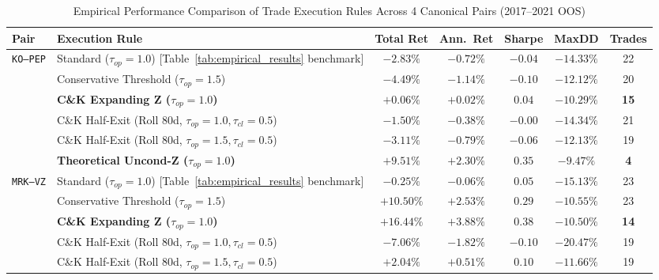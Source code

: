 \documentclass[11pt, a4paper]{article}
\begin{document}
\begin{table}[h!]
\centering
\footnotesize
\setlength{\tabcolsep}{2.5pt}
\caption{Empirical Performance Comparison of Trade Execution Rules Across 4 Canonical Pairs (2017--2021 OOS)}
\label{tab:trade_rules_comparison}
\begin{tabular}{lp{6.4cm}ccccc}
\toprule
\textbf{Pair} & \textbf{Execution Rule} & \textbf{Total Ret} & \textbf{Ann.\ Ret} & \textbf{Sharpe} & \textbf{MaxDD} & \textbf{Trades} \\
\midrule
\texttt{KO--PEP} & Standard ($\tau_{op}=1.0$) [Table~\ref{tab:empirical_results} benchmark] & $-2.83\%$ & $-0.72\%$ & $-0.04$ & $-14.33\%$ & 22 \\
                 & Conservative Threshold ($\tau_{op}=1.5$)                    & $-4.49\%$ & $-1.14\%$ & $-0.10$ & $-12.12\%$ & 20 \\
                 & \textbf{C\&K Expanding Z ($\tau_{op}=1.0$)}                 & $\mathbf{+0.06\%}$ & $\mathbf{+0.02\%}$ & $\mathbf{0.04}$ & $\mathbf{-10.29\%}$ & \textbf{15} \\
                 & C\&K Half-Exit (Roll 80d, $\tau_{op}=1.0, \tau_{cl}=0.5$)   & $-1.50\%$ & $-0.38\%$ & $-0.00$ & $-14.34\%$ & 21 \\
                 & C\&K Half-Exit (Roll 80d, $\tau_{op}=1.5, \tau_{cl}=0.5$)   & $-3.11\%$ & $-0.79\%$ & $-0.06$ & $-12.13\%$ & 19 \\
                 & \textbf{Theoretical Uncond-Z ($\tau_{op}=1.0$)}            & $\mathbf{+9.51\%}$ & $\mathbf{+2.30\%}$ & $\mathbf{0.35}$ & $\mathbf{-9.47\%}$ & \textbf{4} \\
\midrule
\texttt{MRK--VZ} & Standard ($\tau_{op}=1.0$) [Table~\ref{tab:empirical_results} benchmark] & $-0.25\%$ & $-0.06\%$ & $0.05$ & $-15.13\%$ & 23 \\
                 & Conservative Threshold ($\tau_{op}=1.5$)                    & $+10.50\%$ & $+2.53\%$ & $0.29$ & $-10.55\%$ & 23 \\
                 & \textbf{C\&K Expanding Z ($\tau_{op}=1.0$)}                 & $\mathbf{+16.44\%}$ & $\mathbf{+3.88\%}$ & $\mathbf{0.38}$ & $\mathbf{-10.50\%}$ & \textbf{14} \\
                 & C\&K Half-Exit (Roll 80d, $\tau_{op}=1.0, \tau_{cl}=0.5$)   & $-7.06\%$ & $-1.82\%$ & $-0.10$ & $-20.47\%$ & 19 \\
                 & C\&K Half-Exit (Roll 80d, $\tau_{op}=1.5, \tau_{cl}=0.5$)   & $+2.04\%$ & $+0.51\%$ & $0.10$ & $-11.66\%$ & 19 \\

\end{tabular}
\end{table}
\end{document}
